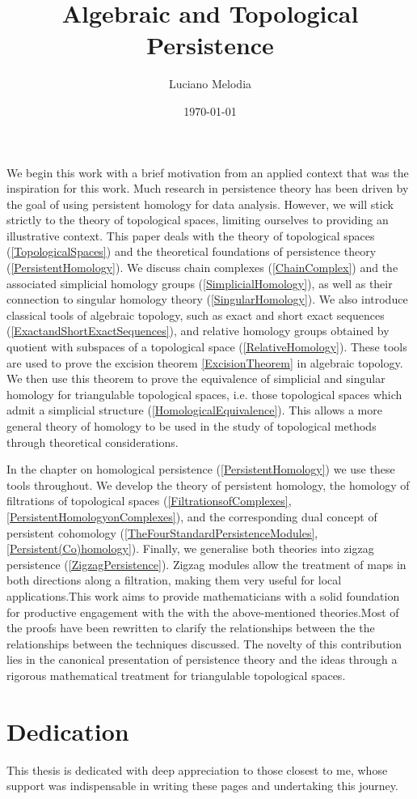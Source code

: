 \documentclass[b5paper, 12pt, twoside]{report}
\title{Algebraic and Topological Persistence}
\author{Luciano Melodia}
\date{\today}
\begin{document}


We begin this work with a brief motivation from an applied context that was the inspiration for this work.  Much research in persistence theory has been driven by the goal of using persistent homology for data analysis. However, we will stick strictly to the theory of topological spaces, limiting ourselves to providing an illustrative context. This paper deals with the theory of topological spaces (\ref{TopologicalSpaces}) and the theoretical foundations of persistence theory (\ref{PersistentHomology}). We discuss chain complexes (\ref{ChainComplex}) and the associated simplicial homology groups (\ref{SimplicialHomology}), as well as their connection to singular homology theory (\ref{SingularHomology}). We also introduce classical tools of algebraic topology, such as exact and short exact sequences (\ref{ExactandShortExactSequences}), and relative homology groups obtained by quotient with subspaces of a topological space (\ref{RelativeHomology}). These tools are used to prove the excision theorem \ref{ExcisionTheorem} in algebraic topology. We then use this theorem to prove the equivalence of simplicial and singular homology for triangulable topological spaces, i.e. those topological spaces which admit a simplicial structure (\ref{HomologicalEquivalence}). This allows a more general theory of homology to be used in the study of topological methods through theoretical considerations.

In the chapter on homological persistence (\ref{PersistentHomology}) we use these tools throughout. We develop the theory of persistent homology, the homology of filtrations of topological spaces (\ref{FiltrationsofComplexes}, \ref{PersistentHomologyonComplexes}), and the corresponding dual concept of persistent cohomology (\ref{TheFourStandardPersistenceModules}, \ref{Persistent(Co)homology}). Finally, we generalise both theories into zigzag persistence (\ref{ZigzagPersistence}). Zigzag modules allow the treatment of maps in both directions along a filtration, making them very useful for local applications.This work aims to provide mathematicians with a solid foundation for productive engagement with the with the above-mentioned theories.Most of the proofs have been rewritten to clarify the relationships between the the relationships between the techniques discussed. The novelty of this
contribution lies in the canonical presentation of persistence theory and the ideas through a rigorous mathematical treatment for triangulable topological spaces.

\chapter*{Dedication}
This thesis is dedicated with deep appreciation to those closest to me, whose
support was indispensable in writing these pages and undertaking this journey.
\end{document}
